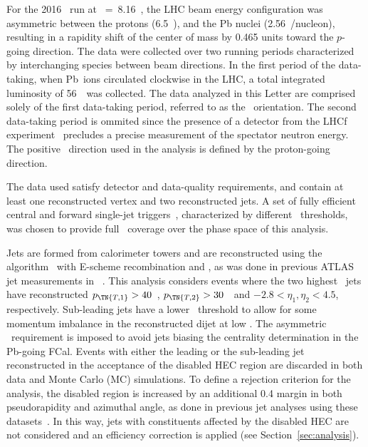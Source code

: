 \documentclass[PAPER, atlasdraft=false, USenglish, cernpreprint]{atlasdoc}
\begin{document}
For the 2016 \pxPb\ run at \SNN~=~8.16~\TeV, the LHC beam energy configuration was asymmetric between the protons (6.5~\TeV), and the Pb nuclei (2.56~\TeV/nucleon), resulting in a rapidity shift of the center of mass by 0.465 units toward the $p$-going direction. 
The data were collected over two running periods characterized by interchanging species between beam directions. 
In the first period of the data-taking, when Pb~ions circulated clockwise in the LHC, a total integrated luminosity of 56~\NB\ was collected. 
The data analyzed in this Letter are comprised solely of the first data-taking period, referred to as the \pxPb\ orientation. 
The second data-taking period is ommited since the presence of a detector from the LHCf experiment~\cite{Adriani:2135330} precludes a precise measurement of the spectator neutron energy. 
The positive \ETA\ direction used in the analysis is defined by the proton-going direction.  






The data used 
satisfy detector and data-quality requirements, and contain at least one reconstructed vertex and two reconstructed jets. 
A set of fully efficient central and forward single-jet triggers~\cite{TRIG-2016-01}, characterized by different \PT\ thresholds, was chosen to provide full \PT\ coverage over the phase space of this analysis. 



Jets are formed from calorimeter towers and are reconstructed using the \antikt algorithm~\cite{Cacciari:2008gp,Fastjet} with E-scheme recombination and \RFour, as was done in previous ATLAS jet measurements in \pxPb~\cite{ATLAS:2022iyq, ATLAS:2023zfx}.
This analysis considers events where the two highest \PT\ jets have reconstructed $p_{\TN{T,1}}>40$~\GeV, $p_{\TN{T,2}}>30$~\GeV\ and $-2.8 < \eta_{1},\eta_{2} < 4.5$, respectively.
Sub-leading jets have a lower \PT\ threshold to allow for some momentum imbalance in the reconstructed dijet at low \PTA.
The asymmetric \ETA\ requirement is imposed to avoid jets biasing the centrality determination in the Pb-going FCal. 
Events with either the leading or the sub-leading jet reconstructed in the acceptance of the disabled HEC region are discarded in both data and Monte Carlo (MC) simulations. 
To define a rejection criterion for the analysis, the disabled region is increased by an additional 0.4 margin in both pseudorapidity and azimuthal angle, as done in previous jet analyses using these datasets~\cite{ATLAS:2023zfx,ATLAS:2022iyq,HION-2017-06}.
In this way, jets with constituents affected by the disabled HEC are not considered and an efficiency correction is applied (see Section~\ref{sec:analysis}). 
\end{document}
